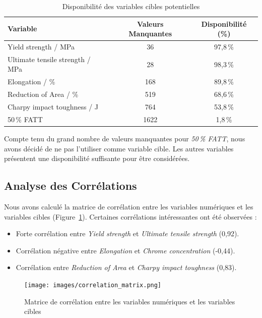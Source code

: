 \documentclass{article}
\begin{document}
\begin{table}[H]
    \centering
    \begin{tabular}{lcc}
    \toprule
    \textbf{Variable} & \textbf{Valeurs Manquantes} & \textbf{Disponibilité (\%)} \\
    \midrule
    Yield strength / MPa & 36 & 97,8\,\% \\
    Ultimate tensile strength / MPa & 28 & 98,3\,\% \\
    Elongation / \% & 168 & 89,8\,\% \\
    Reduction of Area / \% & 519 & 68,6\,\% \\
    Charpy impact toughness / J & 764 & 53,8\,\% \\
    50\,\% FATT & 1622 & 1,8\,\% \\
    \bottomrule
    \end{tabular}
    \caption{Disponibilité des variables cibles potentielles}
    \label{tab:missing_targets}
\end{table}

Compte tenu du grand nombre de valeurs manquantes pour \textit{50\,\% FATT}, nous avons décidé de ne pas l'utiliser comme variable cible. Les autres variables présentent une disponibilité suffisante pour être considérées.

\subsection{Analyse des Corrélations}

Nous avons calculé la matrice de corrélation entre les variables numériques et les variables cibles (Figure~\ref{fig:correlation_matrix}). Certaines corrélations intéressantes ont été observées :

\begin{itemize}
    \item Forte corrélation entre \textit{Yield strength} et \textit{Ultimate tensile strength} (0,92).
    \item Corrélation négative entre \textit{Elongation} et \textit{Chrome concentration} (-0,44).
    \item Corrélation entre \textit{Reduction of Area} et \textit{Charpy impact toughness} (0,83).
\end{itemize}

\begin{figure}[H]
    \centering
    \texttt{[image: images/correlation\_matrix.png]}
    \caption{Matrice de corrélation entre les variables numériques et les variables cibles}
    \label{fig:correlation_matrix}
\end{figure}
\end{document}
